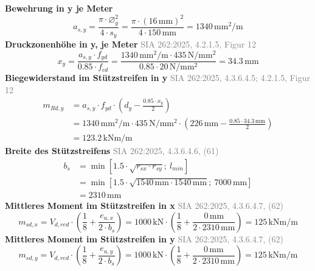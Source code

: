 \documentclass[11pt,a4paper]{article}
\newcommand{\normref}[1]{{\small\textcolor{gray}{#1}}}
\begin{document}
\noindent\textbf{Bewehrung in y je Meter}
\begin{equation*}
a_{s,y} = \frac{\pi \cdot \varnothing_y^{2}}{4 \cdot s_y} = \frac{\pi \cdot \left(16\,\mathrm{mm}\right)^{2}}{4 \cdot 150\,\mathrm{mm}} = 1340\,\mathrm{mm}^{2}/\mathrm{m}
\end{equation*}
\noindent\textbf{Druckzonenhöhe in y, je Meter} \hfill \normref{SIA 262:2025, 4.2.1.5, Figur 12}
\begin{equation*}
x_y = \frac{a_{s,y} \cdot f_{yd}}{0.85 \cdot f_{cd}} = \frac{1340\,\mathrm{mm}^{2}/\mathrm{m} \cdot 435\,\mathrm{N}/\mathrm{mm}^{2}}{0.85 \cdot 20\,\mathrm{N}/\mathrm{mm}^{2}} = 34.3\,\mathrm{mm}
\end{equation*}
\noindent\textbf{Biegewiderstand im Stützstreifen in y} \hfill \normref{SIA 262:2025, 4.3.6.4.5; 4.2.1.5, Figur 12}
\begin{equation*}
\begin{aligned}
  m_{Rd,y} &= a_{s,y} \cdot f_{yd} \cdot \left(d_y - \frac{0.85 \cdot x_y}{2}\right) \\
  &= 1340\,\mathrm{mm}^{2}/\mathrm{m} \cdot 435\,\mathrm{N}/\mathrm{mm}^{2} \cdot \left(226\,\mathrm{mm} - \frac{0.85 \cdot 34.3\,\mathrm{mm}}{2}\right) \\
  &= 123.2\,\mathrm{kNm}/\mathrm{m}
\end{aligned}
\end{equation*}
\noindent\textbf{Breite des Stützstreifens} \hfill \normref{SIA 262:2025, 4.3.6.4.6, (61)}
\begin{equation*}
\begin{aligned}
  b_s &= \min\left[1.5 \cdot \sqrt{r_{sx} \cdot r_{sy}};\ l_{min}\right] \\
  &= \min\left[1.5 \cdot \sqrt{1540\,\mathrm{mm} \cdot 1540\,\mathrm{mm}};\ 7000\,\mathrm{mm}\right] \\
  &= 2310\,\mathrm{mm}
\end{aligned}
\end{equation*}
\noindent\textbf{Mittleres Moment im Stützstreifen in x} \hfill \normref{SIA 262:2025, 4.3.6.4.7, (62)}
\begin{equation*}
m_{sd,x} = V_{d,red} \cdot \left(\frac{1}{8} + \frac{e_{u,x}}{2 \cdot b_s}\right) = 1000\,\mathrm{kN} \cdot \left(\frac{1}{8} + \frac{0\,\mathrm{mm}}{2 \cdot 2310\,\mathrm{mm}}\right) = 125\,\mathrm{kNm}/\mathrm{m}
\end{equation*}
\noindent\textbf{Mittleres Moment im Stützstreifen in y} \hfill \normref{SIA 262:2025, 4.3.6.4.7, (62)}
\begin{equation*}
m_{sd,y} = V_{d,red} \cdot \left(\frac{1}{8} + \frac{e_{u,y}}{2 \cdot b_s}\right) = 1000\,\mathrm{kN} \cdot \left(\frac{1}{8} + \frac{0\,\mathrm{mm}}{2 \cdot 2310\,\mathrm{mm}}\right) = 125\,\mathrm{kNm}/\mathrm{m}
\end{equation*}
\end{document}
